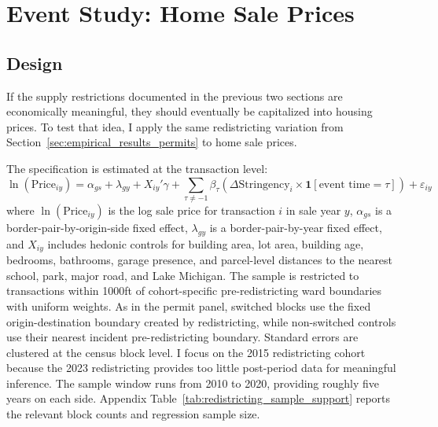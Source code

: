 \section{Event Study: Home Sale Prices}
\label{sec:empirical_results_home_sales}

\subsection{Design}

If the supply restrictions documented in the previous two sections are economically meaningful, they should eventually be capitalized into housing prices. To test that idea, I apply the same redistricting variation from Section~\ref{sec:empirical_results_permits} to home sale prices.

The specification is estimated at the transaction level:
%
\begin{equation}
\label{eq:event_study_sales}
\ln(\text{Price}_{iy}) = \alpha_{gs} + \lambda_{gy} + X_{iy}'\gamma + \sum_{\tau \neq -1} \beta_\tau \left( \Delta\text{Stringency}_i \times \mathbf{1}[\text{event time} = \tau] \right) + \varepsilon_{iy}
\end{equation}
%
where $\ln(\text{Price}_{iy})$ is the log sale price for transaction $i$ in sale year $y$, $\alpha_{gs}$ is a border-pair-by-origin-side fixed effect, $\lambda_{gy}$ is a border-pair-by-year fixed effect, and $X_{iy}$ includes hedonic controls for building area, lot area, building age, bedrooms, bathrooms, garage presence, and parcel-level distances to the nearest school, park, major road, and Lake Michigan. The sample is restricted to transactions within 1000ft of cohort-specific pre-redistricting ward boundaries with uniform weights. As in the permit panel, switched blocks use the fixed origin-destination boundary created by redistricting, while non-switched controls use their nearest incident pre-redistricting boundary. Standard errors are clustered at the census block level. I focus on the 2015 redistricting cohort because the 2023 redistricting provides too little post-period data for meaningful inference. The sample window runs from 2010 to 2020, providing roughly five years on each side. Appendix Table~\ref{tab:redistricting_sample_support} reports the relevant block counts and regression sample size.

